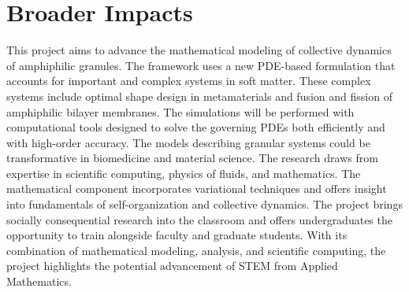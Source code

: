 \section{Broader Impacts}
\label{sec:BroaderImpacts}
This project aims to advance the mathematical modeling of collective
dynamics of amphiphilic granules. The framework uses a new PDE-based
formulation that accounts for important and complex systems in soft
matter. These complex systems include optimal shape design in
metamaterials and fusion and fission of amphiphilic bilayer membranes.
The simulations will be performed with computational tools designed to
solve the governing PDEs both efficiently and with high-order accuracy.
The models describing granular systems could be transformative in
biomedicine and material science. The research draws from expertise in
scientific computing, physics of fluids, and mathematics. The
mathematical component incorporates variational techniques and offers
insight into fundamentals of self-organization and collective dynamics.
The project brings socially consequential research into the classroom
and offers undergraduates the opportunity to train alongside faculty and
graduate students. With its combination of mathematical modeling,
analysis, and scientific computing, the project highlights the potential
advancement of STEM from Applied Mathematics.

